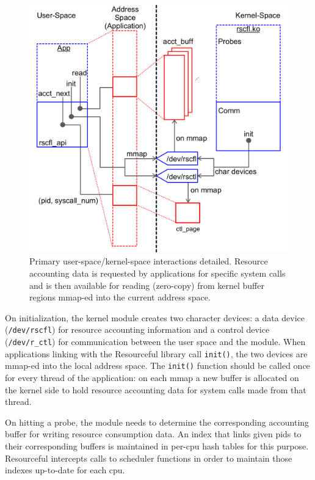 \documentclass[letterpaper,twocolumn,10pt]{article}
\newcommand{\pname}{Resourceful}
\begin{document}
\begin{figure}[ht!] 
	\centering 
	\includegraphics[width=1.1\columnwidth]{sys_design}
	\caption{Primary user-space/kernel-space interactions detailed. Resource
accounting data is requested by applications for specific system calls and is
then available for reading (zero-copy) from kernel buffer regions mmap-ed into
the current address space. } 
	\label{fig:design}
\end{figure}

On initialization, the kernel module creates two character devices: a data
device (\texttt{/dev/rscfl}) for resource accounting information and a control
device (\texttt{/dev/r\_ctl}) for communication between the user space and the module. When
applications linking with the \pname{ }library call \texttt{init()}, the two
devices are mmap-ed into the local address space. The \texttt{init()} function should be
called once for every thread of the application: on each mmap a new buffer is allocated
on the kernel side to hold resource accounting data for system calls made from that thread.

On hitting a probe, the module needs to determine the corresponding accounting
buffer for writing resource consumption data. An index that links given pids to
their corresponding buffers is maintained in per-cpu hash tables for this
purpose. \pname{ } intercepts calls to scheduler functions in order to maintain
those indexes up-to-date for each cpu.
\end{document}
